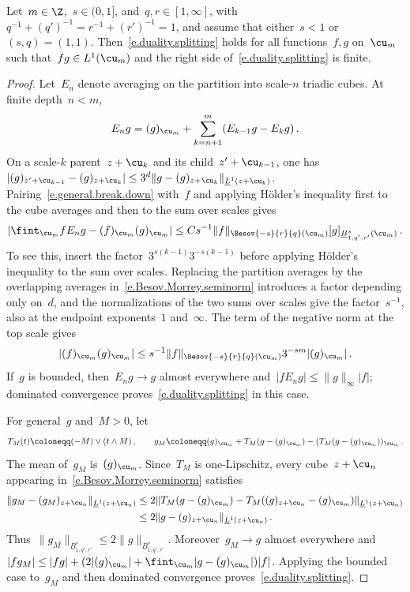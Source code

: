 \documentclass[11pt]{amsart}
\begin{document}
\begin{lemma}
\label{l.circ.norm.dominates}
Let~$m\in\Z$,~$s\in(0,1]$, and~$q,r\in[1,\infty]$, with~$q^{-1}+(q')^{-1}=r^{-1}+(r')^{-1}=1$, and assume that either~$s<1$ or~$(s,q)=(1,1)$. Then~\eqref{e.duality.splitting} holds for all functions~$f,g$ on~$\cu_m$ such that~$fg\in L^1(\cu_m)$ and the right side of~\eqref{e.duality.splitting} is finite.
\end{lemma}
\begin{proof}
Let~$E_n$ denote averaging on the partition into scale-$n$ triadic cubes. At finite depth~$n<m$,
\begin{equation}
	E_ng=(g)_{\cu_m}+\sum_{k=n+1}^m(E_{k-1}g-E_kg)\,.
	\label{e.general.break.down}
\end{equation}
On a scale-$k$ parent~$z+\cu_k$ and its child~$z'+\cu_{k-1}$, one has~$|(g)_{z'+\cu_{k-1}}-(g)_{z+\cu_k}|\leq3^d\|g-(g)_{z+\cu_k}\|_{\underline L^1(z+\cu_k)}$. Pairing~\eqref{e.general.break.down} with~$f$ and applying H\"older's inequality first to the cube averages and then to the sum over scales gives
\begin{equation*}
	\left|\fint_{\cu_m}fE_ng-(f)_{\cu_m}(g)_{\cu_m}\right|
	\leq Cs^{-1}\|f\|_{\Besov{-s}{r}{q}(\cu_m)}
	[g]_{\underline B^s_{1,q',r'}(\cu_m)}\,.
\end{equation*}
To see this, insert the factor~$3^{s(k-1)}3^{-s(k-1)}$ before applying H\"older's inequality to the sum over scales. Replacing the partition averages by the overlapping averages in~\eqref{e.Besov.Morrey.seminorm} introduces a factor depending only on~$d$, and the normalizations of the two sums over scales give the factor~$s^{-1}$, also at the endpoint exponents~$1$ and~$\infty$. The term of the negative norm at the top scale gives
\begin{equation*}
	|(f)_{\cu_m}(g)_{\cu_m}|
	\leq s^{-1}\|f\|_{\Besov{-s}{r}{q}(\cu_m)}
	3^{-sm}|(g)_{\cu_m}|\,.
\end{equation*}
If~$g$ is bounded, then~$E_ng\to g$ almost everywhere and~$|fE_ng|\leq\|g\|_\infty|f|$; dominated convergence proves~\eqref{e.duality.splitting} in this case.

\smallskip

For general~$g$ and~$M>0$, let
\begin{equation*}
	T_M(t)\coloneqq(-M)\vee(t\wedge M)\,,
	\qquad g_M\coloneqq(g)_{\cu_m}+T_M(g-(g)_{\cu_m})-(T_M(g-(g)_{\cu_m}))_{\cu_m}\,.
\end{equation*}
The mean of~$g_M$ is~$(g)_{\cu_m}$. Since~$T_M$ is one-Lipschitz, every cube~$z+\cu_n$ appearing in~\eqref{e.Besov.Morrey.seminorm} satisfies
\begin{align*}
	\|g_M-(g_M)_{z+\cu_n}\|_{\underline L^1(z+\cu_n)}
	&\leq2\|T_M(g-(g)_{\cu_m})-T_M((g)_{z+\cu_n}-(g)_{\cu_m})\|_{\underline L^1(z+\cu_n)}
	\\ &\leq2\|g-(g)_{z+\cu_n}\|_{\underline L^1(z+\cu_n)}\,.
\end{align*}
Thus~$\|g_M\|_{\underline B^s_{1,q',r'}} \leq2\|g\|_{\underline B^s_{1,q',r'}}$. Moreover~$g_M\to g$ almost everywhere and~$|fg_M|\leq|fg|+(2|(g)_{\cu_m}|+\fint_{\cu_m}|g-(g)_{\cu_m}|)|f|$. Applying the bounded case to~$g_M$ and then dominated convergence proves~\eqref{e.duality.splitting}.
\end{proof}
\end{document}
